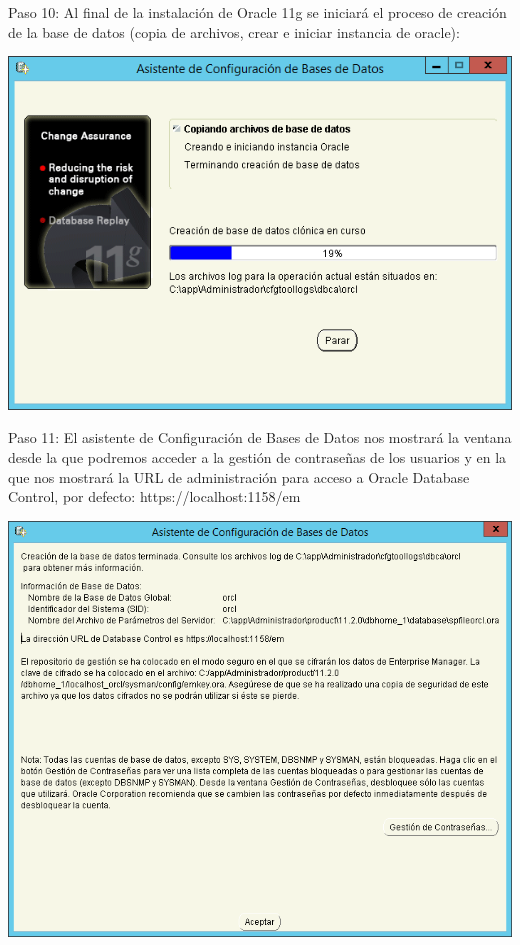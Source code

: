 \documentclass[a4paper,openright,12pt]{book}
\begin{document}
Paso 10: Al final de la instalación de Oracle 11g se iniciará el proceso de creación de la base de datos (copia de archivos, crear e iniciar instancia de oracle):
\begin{center}
\includegraphics[width=15cm]{./windows server/12.png}
\end{center}


Paso 11: El asistente de Configuración de Bases de Datos nos mostrará la ventana desde la que podremos acceder a la gestión de contraseñas de los usuarios y en la que nos mostrará la URL de administración para acceso a Oracle Database Control, por defecto:
https://localhost:1158/em
\begin{center}
\includegraphics[width=15cm]{./windows server/13.png}
\end{center}
\end{document}
